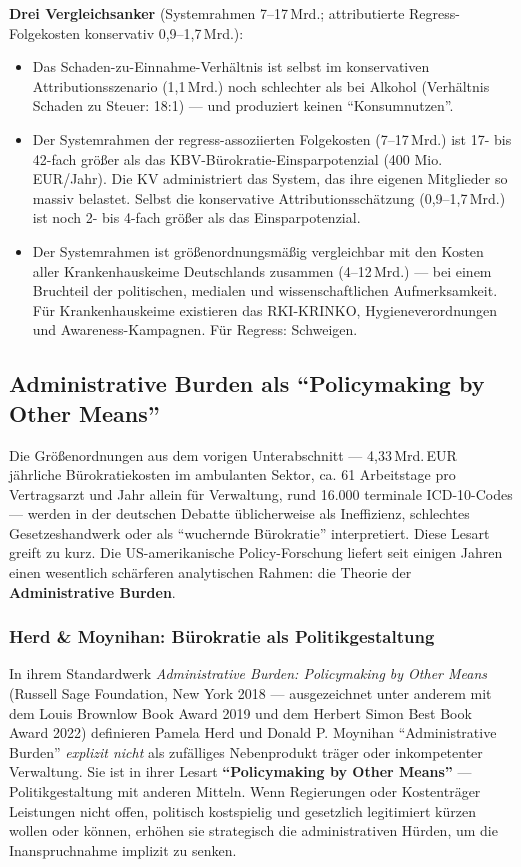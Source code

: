 \documentclass{umbruch-position}
\begin{document}
\textbf{Drei Vergleichsanker} (Systemrahmen 7--17\,Mrd.; attributierte Regress-Folgekosten konservativ 0,9--1,7\,Mrd.):

\begin{itemize}[nosep]
  \item Das Schaden-zu-Einnahme-Verhältnis ist selbst im konservativen Attributionsszenario (1,1\,Mrd.) noch schlechter als bei Alkohol (Verhältnis Schaden zu Steuer: 18:1) --- und produziert keinen ``Konsumnutzen''.
  \item Der Systemrahmen der regress-assoziierten Folgekosten (7--17\,Mrd.) ist 17- bis 42-fach größer als das KBV-Bürokratie-Einsparpotenzial (400 Mio.\,EUR/Jahr). Die KV administriert das System, das ihre eigenen Mitglieder so massiv belastet. Selbst die konservative Attributionsschätzung (0,9--1,7\,Mrd.) ist noch 2- bis 4-fach größer als das Einsparpotenzial.
  \item Der Systemrahmen ist größenordnungsmäßig vergleichbar mit den Kosten aller Krankenhauskeime Deutschlands zusammen (4--12\,Mrd.) --- bei einem Bruchteil der politischen, medialen und wissenschaftlichen Aufmerksamkeit. Für Krankenhauskeime existieren das RKI-KRINKO, Hygieneverordnungen und Awareness-Kampagnen. Für Regress: Schweigen.
\end{itemize}

\subsection{Administrative Burden als ``Policymaking by Other Means''}

Die Größenordnungen aus dem vorigen Unterabschnitt --- 4,33\,Mrd.\,EUR jährliche Bürokratiekosten im ambulanten Sektor, ca. 61 Arbeitstage pro Vertragsarzt und Jahr allein für Verwaltung, rund 16.000 terminale ICD-10-Codes --- werden in der deutschen Debatte üblicherweise als Ineffizienz, schlechtes Gesetzeshandwerk oder als ``wuchernde Bürokratie'' interpretiert. Diese Lesart greift zu kurz. Die US-amerikanische Policy-Forschung liefert seit einigen Jahren einen wesentlich schärferen analytischen Rahmen: die Theorie der \textbf{Administrative Burden}.

\subsubsection{Herd \& Moynihan: Bürokratie als Politikgestaltung}

In ihrem Standardwerk \textit{Administrative Burden: Policymaking by Other Means} (Russell Sage Foundation, New York 2018 --- ausgezeichnet unter anderem mit dem Louis Brownlow Book Award 2019 und dem Herbert Simon Best Book Award 2022) definieren Pamela Herd und Donald P. Moynihan ``Administrative Burden'' \textit{explizit nicht} als zufälliges Nebenprodukt träger oder inkompetenter Verwaltung. Sie ist in ihrer Lesart \textbf{``Policymaking by Other Means''} --- Politikgestaltung mit anderen Mitteln. Wenn Regierungen oder Kostenträger Leistungen nicht offen, politisch kostspielig und gesetzlich legitimiert kürzen wollen oder können, erhöhen sie strategisch die administrativen Hürden, um die Inanspruchnahme implizit zu senken.
\end{document}
